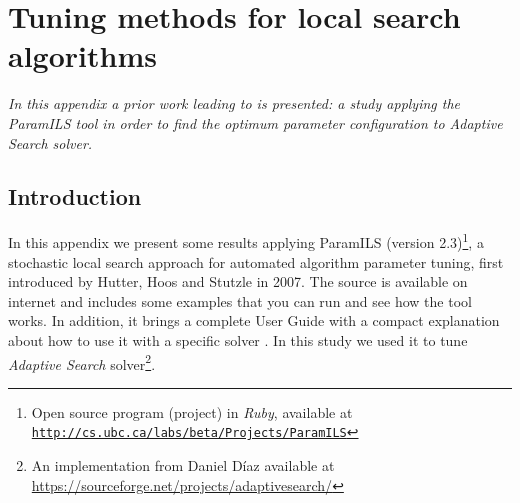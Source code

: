 \chapter{Tuning methods for local search algorithms}
\label{chap:prior_paramils}
\textit{In this appendix a prior work leading to \posl{} is presented: a study applying the {\sc ParamILS} tool in order to find the optimum parameter configuration to {\it Adaptive Search} solver.}

\vspace{2ex}\vfill
\minitoc
\newpage



\section{Introduction}

In this appendix we present some results applying {\sc ParamILS} (version 2.3)\footnote{Open source program (project) in {\it Ruby}, available at \href{http://cs.ubc.ca/labs/beta/Projects/ParamILS}{\texttt{http://cs.ubc.ca/labs/beta/Projects/ParamILS}}}, a stochastic local search approach for automated algorithm parameter tuning, first introduced by Hutter, Hoos and St\:utzle in 2007. The source is available on internet and includes some examples that you can run and see how the tool works. In addition, it brings a complete User Guide with a compact explanation about how to use it with a specific solver \cite{Hutter2008,Hutter2009}. In this study we used it to tune {\it Adaptive Search} solver\footnote{An implementation from Daniel D\'{i}az available at \href{https://sourceforge.net/projects/adaptivesearch/}{https://sourceforge.net/projects/adaptivesearch/}}. %

